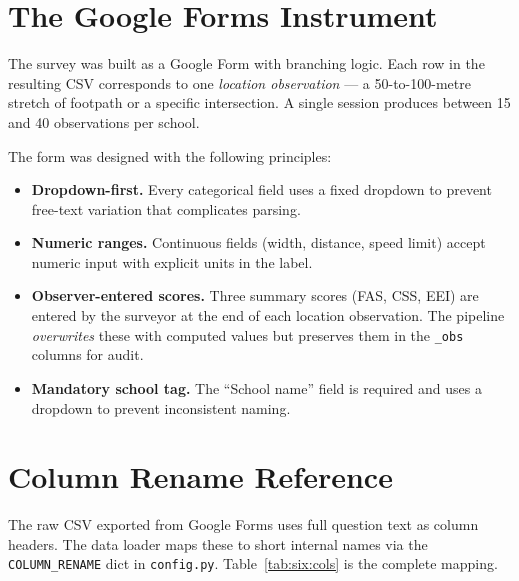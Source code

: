 \documentclass[11pt,a4paper,openany]{book}
\begin{document}
\section{The Google Forms Instrument}

The survey was built as a Google Form with branching logic. Each row in the resulting CSV corresponds to one \emph{location observation} --- a 50-to-100-metre stretch of footpath or a specific intersection. A single session produces between 15 and 40 observations per school.

The form was designed with the following principles:

\begin{itemize}
  \item \textbf{Dropdown-first.} Every categorical field uses a fixed dropdown to prevent free-text variation that complicates parsing.
  \item \textbf{Numeric ranges.} Continuous fields (width, distance, speed limit) accept numeric input with explicit units in the label.
  \item \textbf{Observer-entered scores.} Three summary scores (FAS, CSS, EEI) are entered by the surveyor at the end of each location observation. The pipeline \emph{overwrites} these with computed values but preserves them in the \texttt{\_obs} columns for audit.
  \item \textbf{Mandatory school tag.} The ``School name'' field is required and uses a dropdown to prevent inconsistent naming.
\end{itemize}

\section{Column Rename Reference}

The raw CSV exported from Google Forms uses full question text as column headers. The data loader maps these to short internal names via the \texttt{COLUMN\_RENAME} dict in \texttt{config.py}. Table~\ref{tab:six:cols} is the complete mapping.
\end{document}
